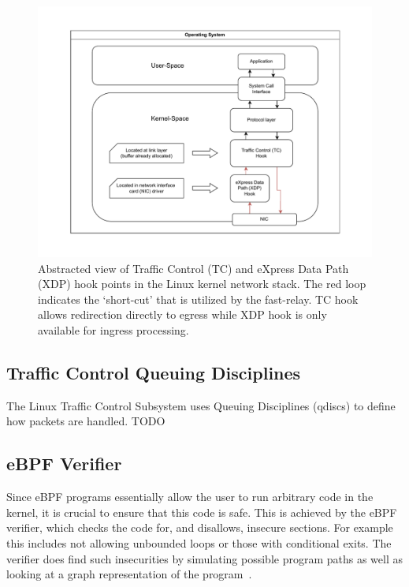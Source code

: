 \begin{figure}[htbp]
    \centering
    \includegraphics[width=\textwidth]{figures/02_background/ebpf-hooks.drawio.pdf}
    \caption{Abstracted view of Traffic Control (TC) and eXpress Data Path (XDP) hook points
    in the Linux kernel network stack.
    The red loop indicates the `short-cut' that is utilized by the fast-relay.
    TC hook allows redirection directly to egress while XDP hook is only available
    for ingress processing.
    }\label{fig:ebpf-hooks}
\end{figure}

\subsection{Traffic Control Queuing Disciplines}
The Linux Traffic Control Subsystem uses Queuing Disciplines (qdiscs) to define how packets
are handled. TODO

\subsection{eBPF Verifier}
Since eBPF programs essentially allow the user to run arbitrary code in the kernel,
it is crucial to ensure that this code is safe.
This is achieved by the eBPF verifier, which checks the code for, and disallows,
insecure sections.
For example this includes not allowing unbounded loops or those with conditional exits.
The verifier does find such insecurities by simulating possible program paths as well as 
looking at a graph representation of the program~\parencite{ebpf-verifier}.

